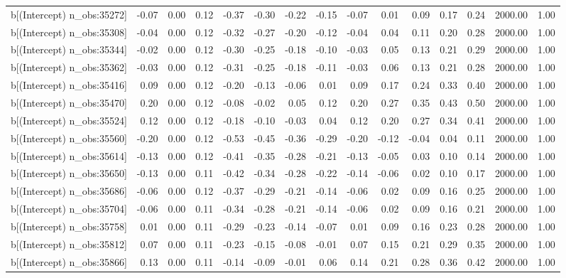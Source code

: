 \begin{table}[ht]
\begin{tabular}{rrrrrrrrrrrrrrr}
  b[(Intercept) n\_obs:35272] & -0.07 & 0.00 & 0.12 & -0.37 & -0.30 & -0.22 & -0.15 & -0.07 & 0.01 & 0.09 & 0.17 & 0.24 & 2000.00 & 1.00 \\ 
  b[(Intercept) n\_obs:35308] & -0.04 & 0.00 & 0.12 & -0.32 & -0.27 & -0.20 & -0.12 & -0.04 & 0.04 & 0.11 & 0.20 & 0.28 & 2000.00 & 1.00 \\ 
  b[(Intercept) n\_obs:35344] & -0.02 & 0.00 & 0.12 & -0.30 & -0.25 & -0.18 & -0.10 & -0.03 & 0.05 & 0.13 & 0.21 & 0.29 & 2000.00 & 1.00 \\ 
  b[(Intercept) n\_obs:35362] & -0.03 & 0.00 & 0.12 & -0.31 & -0.25 & -0.18 & -0.11 & -0.03 & 0.06 & 0.13 & 0.21 & 0.28 & 2000.00 & 1.00 \\ 
  b[(Intercept) n\_obs:35416] & 0.09 & 0.00 & 0.12 & -0.20 & -0.13 & -0.06 & 0.01 & 0.09 & 0.17 & 0.24 & 0.33 & 0.40 & 2000.00 & 1.00 \\ 
  b[(Intercept) n\_obs:35470] & 0.20 & 0.00 & 0.12 & -0.08 & -0.02 & 0.05 & 0.12 & 0.20 & 0.27 & 0.35 & 0.43 & 0.50 & 2000.00 & 1.00 \\ 
  b[(Intercept) n\_obs:35524] & 0.12 & 0.00 & 0.12 & -0.18 & -0.10 & -0.03 & 0.04 & 0.12 & 0.20 & 0.27 & 0.34 & 0.41 & 2000.00 & 1.00 \\ 
  b[(Intercept) n\_obs:35560] & -0.20 & 0.00 & 0.12 & -0.53 & -0.45 & -0.36 & -0.29 & -0.20 & -0.12 & -0.04 & 0.04 & 0.11 & 2000.00 & 1.00 \\ 
  b[(Intercept) n\_obs:35614] & -0.13 & 0.00 & 0.12 & -0.41 & -0.35 & -0.28 & -0.21 & -0.13 & -0.05 & 0.03 & 0.10 & 0.14 & 2000.00 & 1.00 \\ 
  b[(Intercept) n\_obs:35650] & -0.13 & 0.00 & 0.11 & -0.42 & -0.34 & -0.28 & -0.22 & -0.14 & -0.06 & 0.02 & 0.10 & 0.17 & 2000.00 & 1.00 \\ 
  b[(Intercept) n\_obs:35686] & -0.06 & 0.00 & 0.12 & -0.37 & -0.29 & -0.21 & -0.14 & -0.06 & 0.02 & 0.09 & 0.16 & 0.25 & 2000.00 & 1.00 \\ 
  b[(Intercept) n\_obs:35704] & -0.06 & 0.00 & 0.11 & -0.34 & -0.28 & -0.21 & -0.14 & -0.06 & 0.02 & 0.09 & 0.16 & 0.21 & 2000.00 & 1.00 \\ 
  b[(Intercept) n\_obs:35758] & 0.01 & 0.00 & 0.11 & -0.29 & -0.23 & -0.14 & -0.07 & 0.01 & 0.09 & 0.16 & 0.23 & 0.28 & 2000.00 & 1.00 \\ 
  b[(Intercept) n\_obs:35812] & 0.07 & 0.00 & 0.11 & -0.23 & -0.15 & -0.08 & -0.01 & 0.07 & 0.15 & 0.21 & 0.29 & 0.35 & 2000.00 & 1.00 \\ 
  b[(Intercept) n\_obs:35866] & 0.13 & 0.00 & 0.11 & -0.14 & -0.09 & -0.01 & 0.06 & 0.14 & 0.21 & 0.28 & 0.36 & 0.42 & 2000.00 & 1.00 \\ 

\end{tabular}
\end{table}
